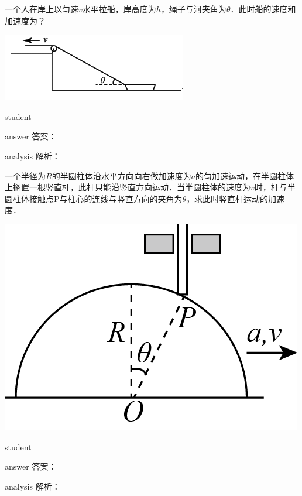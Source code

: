 \begin{example}
	一个人在岸上以匀速$ v $水平拉船，岸高度为$ h $，绳子与河夹角为$ \theta $．此时船的速度和加速度为？
			\begin{flushright}
				\includegraphics[width=0.4\linewidth]{image/kinamatics-9.png}
			\end{flushright}
	
	\begin{taggedblock}{student}
		\vspace*{2cm}
	\end{taggedblock}
	
	
	\begin{taggedblock}{answer}
		答案：
	\end{taggedblock}
	
	
	\begin{taggedblock}{analysis}
		解析：
	\end{taggedblock}
\end{example}


\begin{example}
	一个半径为$ R $的半圆柱体沿水平方向向右做加速度为$ a $的匀加速运动，在半圆柱体上搁置一根竖直杆，此杆只能沿竖直方向运动．当半圆柱体的速度为$ v $时，杆与半圆柱体接触点P与柱心的连线与竖直方向的夹角为$ \theta $，求此时竖直杆运动的加速度．
		\begin{flushright}
			\includegraphics[width=0.3\linewidth]{image/kinamatics-10.png}
		\end{flushright}
	
	\begin{taggedblock}{student}
		\vspace*{2cm}
	\end{taggedblock}
	
	
	\begin{taggedblock}{answer}
		答案：
	\end{taggedblock}
	
	
	\begin{taggedblock}{analysis}
		解析：
	\end{taggedblock}
\end{example}
